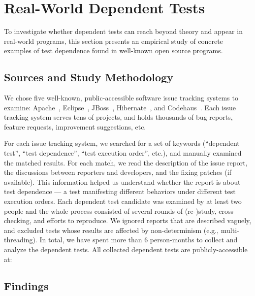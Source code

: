 \section{Real-World Dependent Tests}
\label{sec:study}

To investigate whether dependent tests can reach beyond theory
and appear in real-world programs, this section presents an empirical
study of concrete examples of test dependence found in
well-known open source programs. 


\subsection{Sources and Study Methodology}

We chose five well-known, public-accessible software issue
tracking systems to examine: Apache~\cite{apachebug},
Eclipse~\cite{eclipsebug}, JBoss~\cite{jbossbug},
Hibernate~\cite{hibernatebug}, and Codehaus~\cite{codehausbug}.
Each issue tracking system serves tens of projects, and
holds thousands of bug reports, feature requests, improvement
suggestions, etc.

For each issue tracking system, we searched for a set of keywords
(``dependent test'', ``test dependence'', ``test execution order'',
etc.), and manually examined the matched results. For each match, we read the
description of the issue report, the discussions between reporters
and developers, and the fixing patches (if available). This information
helped us understand whether the report is about test dependence
--- a test manifesting different behaviors under different
test execution orders. Each dependent test candidate was examined by
at least two people and the whole process consisted of several
rounds of (re-)study, cross checking, and efforts to reproduce. We ignored reports
that are described vaguely, and excluded tests whose results are
affected by non-determinism (e.g., multi-threading).
In total, we have spent more than 6 person-months to collect and analyze
the dependent tests. All collected dependent tests are publicly-accessible
at: 


\subsection{Findings}

